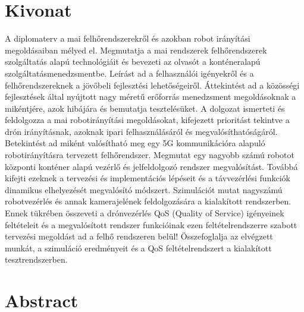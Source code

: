 
\selecthungarian

\chapter*{Kivonat}

A diplomaterv a mai felhőrendszerekről és azokban robot irányítási megoldásaiban mélyed el.
Megmutatja a mai rendszerek felhőrendszerek szolgáltatás alapú technológiáit és bevezeti az olvasót a konténeralapú szolgáltatásmenedzsmentbe. Leírást ad a felhasználói igényekről és a felhőrendszereknek a jövőbeli fejlesztési lehetőségeiről. Áttekintést ad a közösségi fejlesztések által nyújtott nagy méretű erőforrás menedzsment megoldásoknak a mikéntjére, azok hibájára és bemutatja tesztelésüket. A dolgozat ismerteti és feldolgozza a mai robotirányítási megoldásokat, kifejezett prioritást tekintve a drón irányításnak, azoknak ipari felhasználásáról és megvalósíthatóságáról. Betekintést ad miként valósítható meg egy 5G kommunikációra alapuló robotirányításra tervezett felhőrendszer. Megmutat egy nagyobb számú robotot központi konténer alapú vezérlő és jelfeldolgozó rendszer megvalósítást. Továbbá kifejti ezeknek a tervezési és implementációs lépéseit és a távvezérlési funkciók dinamikus elhelyezését megvalósító módszert. Szimulációt mutat nagyszámú robotvezérlés és annak kamerajelének feldolgozására a kialakított rendszerben. Ennek tükrében összeveti a drónvezérlés QoS (Quality of Service) igényeinek feltételeit és a megvalósított rendszer funkcióinak ezen feltételrendszerre szabott tervezési megoldást ad a felhő rendszeren belül!
Összefoglalja az elvégzett munkát, a szimuláció eredményeit és a QoS feltételrendszert a kialakított tesztrendszerben.


\vfill
\selectenglish


\chapter*{Abstract}

